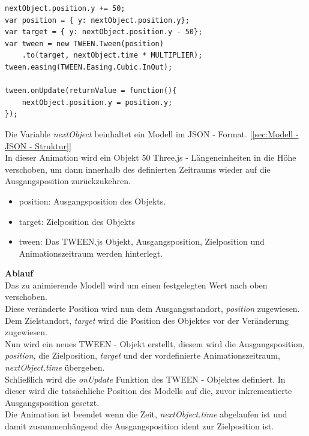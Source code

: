 \begin{lstlisting}
nextObject.position.y += 50;
var position = { y: nextObject.position.y};
var target = { y: nextObject.position.y - 50};
var tween = new TWEEN.Tween(position)
    .to(target, nextObject.time * MULTIPLIER);
tween.easing(TWEEN.Easing.Cubic.InOut);

tween.onUpdate(returnValue = function(){
    nextObject.position.y = position.y;
});
\end{lstlisting}
Die Variable \textit{nextObject} beinhaltet ein Modell im JSON - Format. [\ref{sec:Modell - JSON - Struktur}]
\\
In dieser Animation wird ein Objekt 50 Three.js - Längeneinheiten in die Höhe verschoben, um dann innerhalb des definierten Zeitraums wieder auf die Ausgangsposition zurückzukehren.
\begin{itemize}
    \item position: Ausgangsposition des Objekts.
    \item target: Zielposition des Objekts
    \item tween: Das TWEEN.js Objekt, Ausgangsposition, Zielposition und Animationszeitraum werden hinterlegt.
\end{itemize}
\textbf{Ablauf} \\
Das zu animierende Modell wird um einen festgelegten Wert nach oben verschoben. \\
Diese veränderte Position wird nun dem Ausgangsstandort, \textit{position} zugewiesen. \\
Dem Zielstandort, \textit{target} wird die Position des Objektes vor der Veränderung zugewiesen. \\
Nun wird ein neues TWEEN - Objekt erstellt, diesem wird die Ausgangsposition, \textit{position}, die Zielposition, \textit{target} und der vordefinierte Animationszeitraum, \textit{nextObject.time} übergeben. \\
Schließlich wird die \textit{onUpdate} Funktion des TWEEN - Objektes definiert. In dieser wird die tatsächliche Position des Modells auf die, zuvor inkrementierte Ausgangsposition gesetzt. \\
Die Animation ist beendet wenn die Zeit, \textit{nextObject.time} abgelaufen ist und damit zusammenhängend die Ausgangsposition ident zur Zielposition ist.
\newpage
